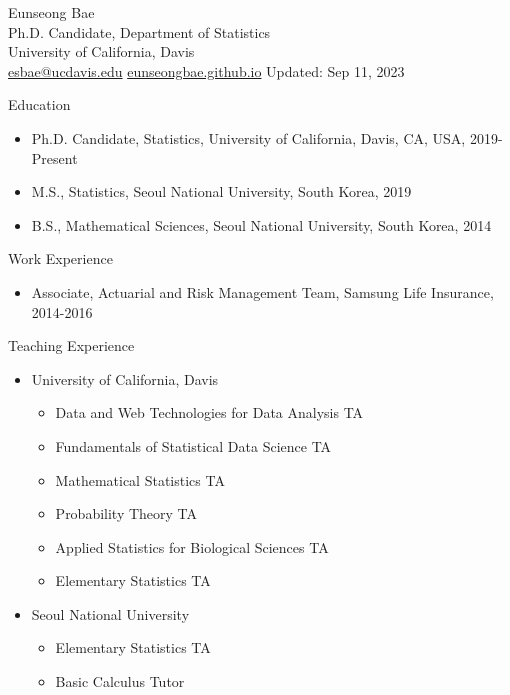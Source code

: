 \documentclass[11pt]{letter}
\begin{document}
\selectfont
\thispagestyle{empty}

\begin{center} 
{\Huge
Eunseong Bae} \\[1em] 
Ph.D. Candidate, Department of Statistics \\ 
University of California, Davis \\ 
\href{mailto:esbae@ucdavis.edu}{esbae@ucdavis.edu} \quad 
\href{https://eunseongbae.github.io}{eunseongbae.github.io} \quad 
Updated: Sep 11, 2023
\end{center}
 \vspace{1em} 
{\Large Education}

\begin{itemize} 
 	\item Ph.D. Candidate, Statistics, University of California, Davis, CA, USA, 2019-Present
	\item M.S., Statistics, Seoul National University, South Korea, 2019
	\item B.S., Mathematical Sciences, Seoul National University, South Korea, 2014
\end{itemize} 

{\Large Work Experience}

\begin{itemize} 
 	\item Associate, Actuarial and Risk Management Team, Samsung Life Insurance, 2014-2016
\end{itemize} 

{\Large Teaching Experience}

\begin{itemize} 
 	\item University of California, Davis
	\begin{itemize}[leftmargin=1.5em] 
		\item  Data and Web Technologies for Data Analysis TA \href{}{}
		\item  Fundamentals of Statistical Data Science TA \href{}{}
		\item  Mathematical Statistics TA \href{}{}
		\item  Probability Theory TA \href{}{}
		\item  Applied Statistics for Biological Sciences TA \href{}{}
		\item  Elementary Statistics TA \href{}{}
	\end{itemize} 
	\item Seoul National University
	\begin{itemize}[leftmargin=1.5em] 
		\item  Elementary Statistics TA \href{}{}
		\item  Basic Calculus Tutor \href{}{}
\end{itemize} 
\end{itemize} 
\end{document}

